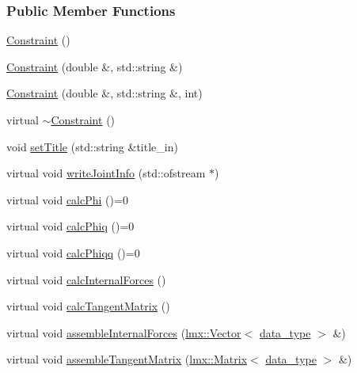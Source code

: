 \subsubsection*{Public Member Functions}
\begin{DoxyCompactItemize}
\item 
\hyperlink{classmknix_1_1_constraint_ae4a69ed64d7746a7f8e2d23f04bc6de6}{Constraint} ()
\item 
\hyperlink{classmknix_1_1_constraint_a093b4ffce363485f60ba251356ff88d1}{Constraint} (double \&, std\+::string \&)
\item 
\hyperlink{classmknix_1_1_constraint_a286b8de04619afb63e772520d659855a}{Constraint} (double \&, std\+::string \&, int)
\item 
virtual \hyperlink{classmknix_1_1_constraint_a84cbe5af8074dc229f583d119bbde3e1}{$\sim$\+Constraint} ()
\item 
void \hyperlink{classmknix_1_1_constraint_a29894979f193b76289f112e9db6a8d87}{set\+Title} (std\+::string \&title\+\_\+in)
\item 
virtual void \hyperlink{classmknix_1_1_constraint_a85f9a1e3ffe92fa380deec57b25bc520}{write\+Joint\+Info} (std\+::ofstream $\ast$)
\item 
virtual void \hyperlink{classmknix_1_1_constraint_a7f2b34d256d5eec54b34b0440b562ec1}{calc\+Phi} ()=0
\item 
virtual void \hyperlink{classmknix_1_1_constraint_ab129143960df2b9459e274275608bcf2}{calc\+Phiq} ()=0
\item 
virtual void \hyperlink{classmknix_1_1_constraint_a73ff21573b5e9c4acda789bd5ac46ea8}{calc\+Phiqq} ()=0
\item 
virtual void \hyperlink{classmknix_1_1_constraint_a00ea21a19168bc3cfd3ba97c6a2be31d}{calc\+Internal\+Forces} ()
\item 
virtual void \hyperlink{classmknix_1_1_constraint_a9b7594c65aa792ffb56d3a598996a969}{calc\+Tangent\+Matrix} ()
\item 
virtual void \hyperlink{classmknix_1_1_constraint_aca5d35f6ecd8f8f3852c150c7901b890}{assemble\+Internal\+Forces} (\hyperlink{classlmx_1_1_vector}{lmx\+::\+Vector}$<$ \hyperlink{namespacemknix_a16be4b246fbf2cceb141e3a179111020}{data\+\_\+type} $>$ \&)
\item 
virtual void \hyperlink{classmknix_1_1_constraint_ac376643d6d73cb3b591ba80aae9f7166}{assemble\+Tangent\+Matrix} (\hyperlink{classlmx_1_1_matrix}{lmx\+::\+Matrix}$<$ \hyperlink{namespacemknix_a16be4b246fbf2cceb141e3a179111020}{data\+\_\+type} $>$ \&)
\item 

\end{DoxyCompactItemize}
